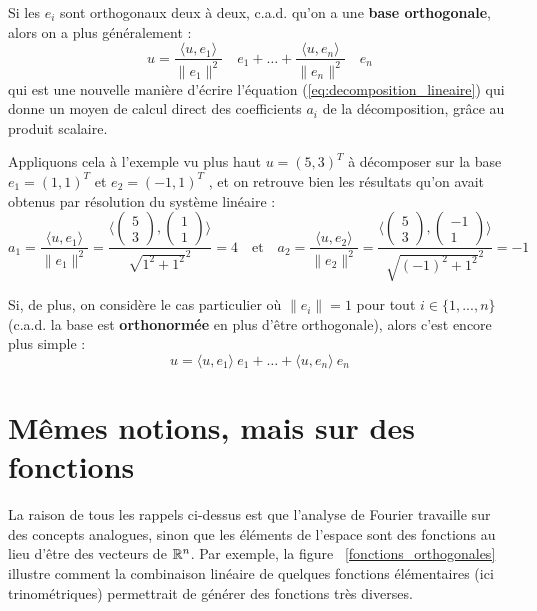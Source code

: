 Si les $e_i$ sont orthogonaux deux à deux, c.a.d. qu'on a une \textbf{base orthogonale}, alors on a plus généralement :
\begin{equation}
u = \frac{\langle u , e_1 \rangle}{\|e_1\|^2} \quad e_1 +\dots + \frac{\langle u , e_n \rangle}{\|e_n\|^2} \quad e_n 
\end{equation}
qui est une nouvelle manière d'écrire l'équation (\ref{eq:decomposition_lineaire}) qui donne un moyen de calcul direct des coefficients $a_i$ de la décomposition, grâce au produit scalaire.

Appliquons cela à l'exemple vu plus haut $u=(5,3)^T$ à décomposer sur la base $e_1=(1,1)^T$ et $e_2=(-1,1)^T$ , et on retrouve bien les résultats qu'on avait obtenus par résolution du système linéaire :
\begin{equation*}
a_1=\frac{\langle u , e_1 \rangle}{\|e_1\|^2} = \frac{\langle\begin{pmatrix} 5 \\ 3 \end{pmatrix},\begin{pmatrix} 1 \\ 1 \end{pmatrix}\rangle}{\sqrt{1^2+1^2}^2}=4 \quad \text{et} \quad a_2=\frac{\langle u , e_2 \rangle}{\|e_2\|^2} = \frac{\langle\begin{pmatrix} 5 \\ 3 \end{pmatrix},\begin{pmatrix} -1 \\ 1 \end{pmatrix}\rangle}{\sqrt{(-1)^2+1^2}^2}=-1 
\end{equation*}

Si, de plus, on considère le cas particulier où $\|e_i\|=1$ pour tout $i \in \{1,...,n\}$ (c.a.d. la base est \textbf{orthonormée} en plus d'être orthogonale), alors c'est encore plus simple :
\begin{equation}
u = \langle u , e_1 \rangle ~e_1 +\dots + \langle u , e_n \rangle ~e_n 
\end{equation}

\section{Mêmes notions, mais sur des fonctions}

La raison de tous les rappels ci-dessus est que l'analyse de Fourier travaille sur des concepts analogues, sinon que les éléments de l'espace sont des fonctions au lieu d'être des vecteurs de $\mathbb{R}^n$. Par exemple, la figure ~\ref{fonctions_orthogonales} illustre comment la combinaison linéaire de quelques fonctions élémentaires (ici trinométriques) permettrait de générer des fonctions très diverses.

